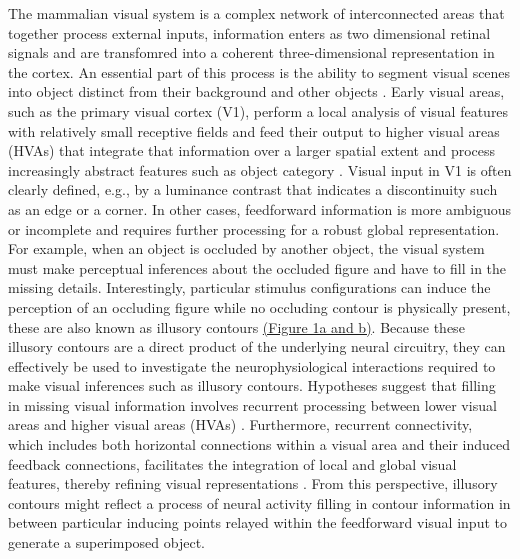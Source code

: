 \documentclass[12pt]{article}
\begin{document}
\setlength{\parindent}{24pt}
The mammalian visual system is a complex network of interconnected areas that together process external inputs, information enters as two dimensional retinal signals and are transfomred into a coherent three-dimensional representation in the cortex. An essential part of this process is the ability to segment visual scenes into object distinct from their background and other objects \autocite{kirchbergerEssentialRoleFeedback2020}. Early visual areas, such as the primary visual cortex (V1), perform a local analysis of visual features with relatively small receptive fields and feed their output to higher visual areas (HVAs) that integrate that information over a larger spatial extent and process increasingly abstract features such as object category \autocite{ashbridgeEffectImageOrientation2000}. Visual input in V1 is often clearly defined, e.g., by a luminance contrast that indicates a discontinuity such as an edge or a corner. In other cases, feedforward information is more ambiguous or incomplete and requires further processing for a robust global representation. For example, when an object is occluded by another object, the visual system must make perceptual inferences about the occluded figure and have to fill in the missing details. Interestingly, particular stimulus configurations can induce the perception of an occluding figure while no occluding contour is physically present, these are also known as illusory contours \hyperref[fig:figure_1]{(Figure 1a and b)}. Because these illusory contours are a direct product of the underlying neural circuitry, they can effectively be used to investigate the neurophysiological interactions required to make visual inferences such as illusory contours. Hypotheses suggest that filling in missing visual information involves recurrent processing between lower visual areas and higher visual areas (HVAs) \autocite{wyatteEarlyRecurrentFeedback2014}. Furthermore, recurrent connectivity, which includes both horizontal connections within a visual area and their induced feedback connections, facilitates the integration of local and global visual features, thereby refining visual representations \autocite{roelfsemaCORTICALALGORITHMSPERCEPTUAL2006,shushruthStrongRecurrentNetworks2012}. From this perspective, illusory contours might reflect a process of neural activity filling in contour information in between particular inducing points relayed within the feedforward visual input to generate a superimposed object.
\setlength{\parindent}{0pt}
\end{document}

